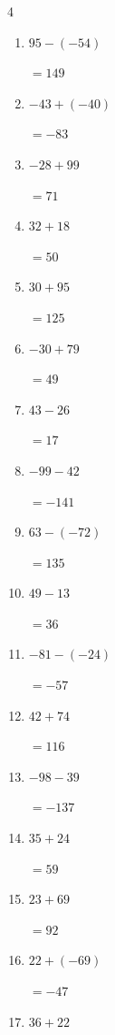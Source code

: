 \begin{multicols}{4}
\begin{enumerate}
  \item $95-(-54)$

        $=149$

  \item $-43+(-40)$

        $=-83$

  \item $-28+99$

        $=71$

\columnbreak %

  \item $32+18$

        $=50$

  \item $30+95$

        $=125$

  \item $-30+79$

        $=49$

  \item $43-26$

        $=17$

  \item $-99-42$

        $=-141$

  \item $63-(-72)$

        $=135$

  \item $49-13$

        $=36$

  \item $-81-(-24)$

        $=-57$

  \item $42+74$

        $=116$

  \item $-98-39$

        $=-137$

  \item $35+24$

        $=59$

  \item $23+69$

        $=92$

  \item $22+(-69)$

        $=-47$

  \item $36+22$


\end{enumerate}
\end{multicols}
